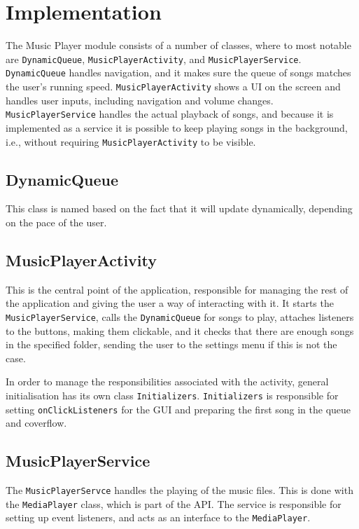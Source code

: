 \section{Implementation}
The Music Player module consists of a number of classes, where to most notable are \texttt{DynamicQueue}, \texttt{MusicPlayerActivity}, and \texttt{MusicPlayerService}. \texttt{DynamicQueue} handles navigation, and it makes sure the queue of songs matches the user's running speed. \texttt{MusicPlayerActivity} shows a UI on the screen and handles user inputs, including navigation and volume changes. \texttt{MusicPlayerService} handles the actual playback of songs, and because it is implemented as a service it is possible to keep playing songs in the background, i.e., without requiring \texttt{MusicPlayerActivity} to be visible.

\subsection{DynamicQueue}
\label{sec:dynamicQueue}
This class is named based on the fact that it will update dynamically, depending on the pace of the user.

\subsection{MusicPlayerActivity}
This is the central point of the application, responsible for managing the rest of the application and giving the user a way of interacting with it. It starts the \texttt{MusicPlayerService}, calls the \texttt{DynamicQueue} for songs to play, attaches listeners to the buttons, making them clickable, and it checks that there are enough songs in the specified folder, sending the user to the settings menu if this is not the case.

In order to manage the responsibilities associated with the activity, general initialisation has its own class \texttt{Initializers}. \texttt{Initializers} is responsible for setting \texttt{onClickListeners} for the GUI and preparing the first song in the queue and coverflow. 

\subsection{MusicPlayerService} 
The \texttt{MusicPlayerServce} handles the playing of the music files. This is done with the \texttt{MediaPlayer} class, which is part of the \citet{android:MediaPlayer} API. The service is responsible for setting up event listeners, and acts as an interface to the \texttt{MediaPlayer}.  

